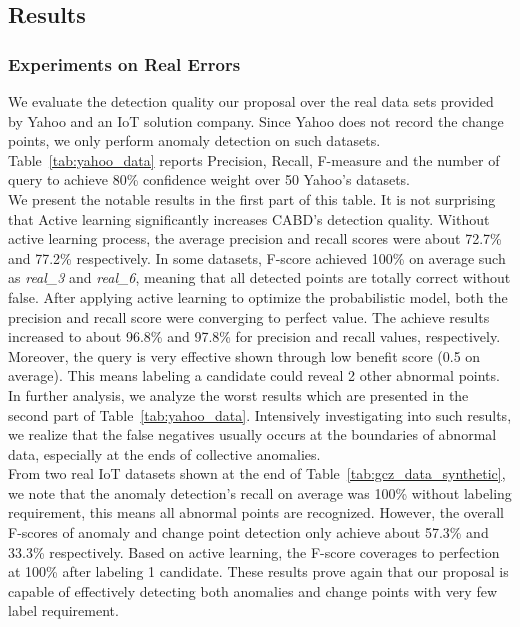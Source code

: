 \subsection{Results}
\subsubsection{Experiments on Real Errors}

We evaluate the detection quality our proposal over the real data sets provided by Yahoo and an IoT solution company. Since Yahoo does not record the change points, we only perform anomaly detection on such datasets. Table~\ref{tab:yahoo_data} reports Precision, Recall, F-measure and the number of query to achieve 80\% confidence weight over 50 Yahoo's datasets.\\

We present the notable results in the first part of this table. It is not surprising that Active learning significantly increases CABD's detection quality. Without active learning process, the average precision and recall scores were about 72.7\% and 77.2\% respectively. In some datasets, F-score achieved 100\% on average such as \textit{real\_3} and \textit{real\_6}, meaning that all detected points are totally correct without false. After applying active learning to optimize the probabilistic model, both the precision and recall score were converging to perfect value. The achieve results increased to about 96.8\% and 97.8\% for precision and recall values, respectively. Moreover, the query is very effective shown through low benefit score (0.5 on average). This means labeling a candidate could reveal 2 other abnormal points. \\

In further analysis, we analyze the worst results which are presented in the second part of Table~\ref{tab:yahoo_data}. Intensively investigating into such results, we realize that the false negatives usually occurs at the boundaries of abnormal data, especially at the ends of collective anomalies. \\

From two real IoT datasets shown at the end of Table~\ref{tab:gcz_data_synthetic}, we note that the anomaly detection's recall on average was 100\% without labeling requirement, this means all abnormal points are recognized. However, the overall F-scores of anomaly and change point detection only achieve about 57.3\% and 33.3\% respectively. Based on active learning, the F-score coverages to perfection at 100\% after labeling 1 candidate. These results prove again that our proposal is capable of effectively detecting both anomalies and change points with very few label requirement. %
\\

